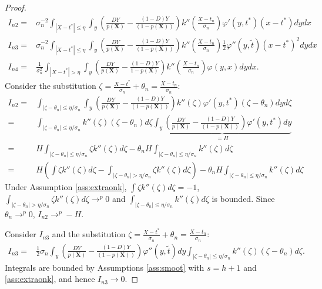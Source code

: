 {\begin{proof}
\begin{align}
            I_{n2} =& \sigma_n^{-2} \int_{|X-t^*| \leq \eta} \int_y \left(\frac{D Y}{p(\textbf{X})} - \frac{(1-D) Y}{(1-p(\textbf{X}))} \right) k''\left(\frac{X - t_n}{\sigma_n} \right) \varphi'(y,t^*)(x - t^*) dy dx \\
            I_{n3} =& \sigma_n^{-2} \int_{|X-t^*| \leq \eta} \int_y \left(\frac{D Y}{p(\textbf{X})} - \frac{(1-D) Y}{(1-p(\textbf{X}))} \right) k''\left(\frac{X - t_n}{\sigma_n} \right) \frac{1}{2} \varphi''(y,\tilde{t})(x - t^*)^2 dy dx \\
            I_{n4} =& \frac{1}{\sigma_n^2} \int_{|X-t^*| > \eta} \int_y \left(\frac{D Y}{p(\textbf{X})} - \frac{(1-D) Y}{1-p(\textbf{X})} \right) k''\left(\frac{X - t_n}{\sigma_n} \right) \varphi(y,x) dy dx.
        \end{align}
        Consider the substitution $\zeta = \frac{X - t^*}{\sigma_n} + \theta_n = \frac{X - t_n}{\sigma_n}$:
        \begin{align}
            I_{n2} =& \int_{|\zeta - \theta_n| \leq \eta/\sigma_n} \int_y \left(\frac{D Y}{p(\textbf{X})} - \frac{(1-D) Y}{(1-p(\textbf{X}))} \right)
            k''\left(\zeta \right) \varphi'(y,t^*)(\zeta - \theta_n) dy d\zeta \\
            =& \int_{|\zeta - \theta_n| \leq \eta/\sigma_n} k''\left(\zeta \right) (\zeta - \theta_n) d\zeta \underbrace{\int_y \left(\frac{D Y}{p(\textbf{X})} - \frac{(1-D) Y}{(1-p(\textbf{X}))} \right) \varphi'(y,t^*) dy}_{=H} \\
            =& H \int_{|\zeta - \theta_n| \leq \eta/\sigma_n} \zeta k''\left(\zeta \right)d\zeta - \theta_n H \int_{|\zeta - \theta_n| \leq \eta/\sigma_n} k''\left(\zeta \right) d\zeta\\
            =& H \left( \int \zeta k''\left(\zeta \right)d\zeta - \int_{|\zeta - \theta_n| > \eta/\sigma_n} \zeta k''\left(\zeta \right)d\zeta\right) - \theta_n H \int_{|\zeta - \theta_n| \leq \eta/\sigma_n} k''\left(\zeta \right) d\zeta
        \end{align}
        Under Assumption \ref{ass:extraonk}, $\int \zeta k''\left(\zeta \right)d\zeta = -1$, $\int_{|\zeta - \theta_n| > \eta/\sigma_n} \zeta k''\left(\zeta \right)d\zeta \rightarrow^p 0$ and $\int_{|\zeta - \theta_n| \leq \eta/\sigma_n} k''\left(\zeta \right) d\zeta$ is bounded. Since $\theta_n \rightarrow^p 0$, $I_{n2}\rightarrow^p -H$.

        Consider $I_{n3}$ and the substitution $\zeta = \frac{X - t^*}{\sigma_n} + \theta_n = \frac{X - t_n}{\sigma_n}$:
        \begin{align}
            I_{n3} =& \frac{1}{2} \sigma_n \int_y \left(\frac{D Y}{p(\textbf{X})} - \frac{(1-D) Y}{(1-p(\textbf{X}))} \right) \varphi''(y,\tilde{t}) dy \int_{|\zeta - \theta_n| \leq \eta/\sigma_n} k''\left(\zeta \right)(\zeta - \theta_n) d\zeta.
        \end{align}
        Integrals are bounded by Assumptions \ref{ass:smoot} with $s=h+1$ and \ref{ass:extraonk}, and hence $I_{n3}\rightarrow 0$.


\end{proof}}
